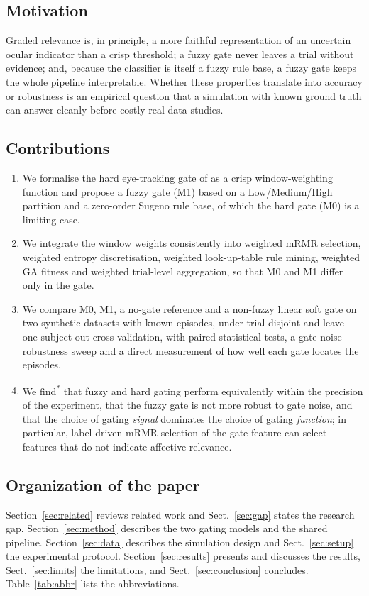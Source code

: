 \documentclass[11pt,a4paper]{article}
\newcommand{\simnote}{\textsuperscript{$\ast$}}
\begin{document}
\subsection{Motivation}
Graded relevance is, in principle, a more faithful representation of an uncertain ocular indicator than a crisp threshold; a fuzzy gate never leaves a trial without evidence; and, because the classifier is itself a fuzzy rule base, a fuzzy gate keeps the whole pipeline interpretable. Whether these properties translate into accuracy or robustness is an empirical question that a simulation with known ground truth can answer cleanly before costly real-data studies.

\subsection{Contributions}
\begin{enumerate}
  \item We formalise the hard eye-tracking gate of \cite{FarhadiSedehi2024a} as a crisp window-weighting function and propose a fuzzy gate (M1) based on a Low/Medium/High partition and a zero-order Sugeno rule base, of which the hard gate (M0) is a limiting case.
  \item We integrate the window weights consistently into weighted mRMR selection, weighted entropy discretisation, weighted look-up-table rule mining, weighted GA fitness and weighted trial-level aggregation, so that M0 and M1 differ only in the gate.
  \item We compare M0, M1, a no-gate reference and a non-fuzzy linear soft gate on two synthetic datasets with known episodes, under trial-disjoint and leave-one-subject-out cross-validation, with paired statistical tests, a gate-noise robustness sweep and a direct measurement of how well each gate locates the episodes.
  \item We find\simnote{} that fuzzy and hard gating perform equivalently within the precision of the experiment, that the fuzzy gate is not more robust to gate noise, and that the choice of gating \emph{signal} dominates the choice of gating \emph{function}; in particular, label-driven mRMR selection of the gate feature can select features that do not indicate affective relevance.
\end{enumerate}

\subsection{Organization of the paper}
Section~\ref{sec:related} reviews related work and Sect.~\ref{sec:gap} states the research gap. Section~\ref{sec:method} describes the two gating models and the shared pipeline. Section~\ref{sec:data} describes the simulation design and Sect.~\ref{sec:setup} the experimental protocol. Section~\ref{sec:results} presents and discusses the results, Sect.~\ref{sec:limits} the limitations, and Sect.~\ref{sec:conclusion} concludes. Table~\ref{tab:abbr} lists the abbreviations.
\end{document}
